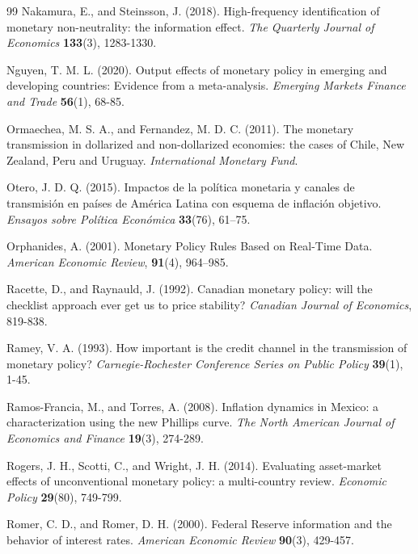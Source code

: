 \documentclass[12pt, reqno]{article}
\begin{document}
\begin{thebibliography}{99}
\bibitem{} \hypertarget{Nakamura and Steinsson (2018)}{} 
Nakamura, E., and Steinsson, J. (2018). High-frequency identification of monetary non-neutrality: the information effect. \textit{The Quarterly Journal of Economics} \textbf{133}(3), 1283-1330.

\bibitem{} \hypertarget{Nguyen (2020)}{}Nguyen, T. M. L. (2020). Output effects of monetary policy in emerging and developing countries: Evidence from a meta-analysis. \textit{Emerging Markets Finance and Trade} \textbf{56}(1), 68-85.

\bibitem{} \hypertarget{Ormaechea and Fernandez (2011)}{} 
Ormaechea, M. S. A., and Fernandez, M. D. C. (2011). The monetary transmission in dollarized and non-dollarized economies: the cases of Chile, New Zealand, Peru and Uruguay. \textit{International Monetary Fund}.

\bibitem{} \hypertarget{Otero (2015)}{}
Otero, J. D. Q. (2015). Impactos de la política monetaria y canales de transmisión en países de América Latina con esquema de inflación objetivo. \textit{Ensayos sobre Política Económica} \textbf{33}(76), 61–75.

\bibitem{} \hypertarget{Orphanides (2001)}{}Orphanides, A. (2001). Monetary Policy Rules Based on Real-Time Data. \textit{American Economic Review}, \textbf{91}(4), 964–985.

\bibitem{} \hypertarget{Racette and Raynauld (1992)}{}Racette, D., and Raynauld, J. (1992). Canadian monetary policy: will the checklist approach ever get us to price stability? \textit{Canadian Journal of Economics}, 819-838.

\bibitem{} \hypertarget{Ramey (1993)}{}
Ramey, V. A. (1993). How important is the credit channel in the transmission of monetary policy? \textit{Carnegie-Rochester Conference Series on Public Policy} \textbf{39}(1), 1-45.

\bibitem{} \hypertarget{Ramos-Francia and Torres (2008)}{} 
Ramos-Francia, M., and Torres, A. (2008). Inflation dynamics in Mexico: a characterization using the new Phillips curve. \textit{The North American Journal of Economics and Finance} \textbf{19}(3), 274-289.

\bibitem{} \hypertarget{Rogers et al. (2014)}{}Rogers, J. H., Scotti, C., and Wright, J. H. (2014). Evaluating asset-market effects of unconventional monetary policy: a multi-country review. \textit{Economic Policy} \textbf{29}(80), 749-799.

\bibitem{} \hypertarget{Romer and Romer (2000)}{} 
Romer, C. D., and Romer, D. H. (2000). Federal Reserve information and the behavior of interest rates. \textit{American Economic Review} \textbf{90}(3), 429-457.


\end{thebibliography}
\end{document}
